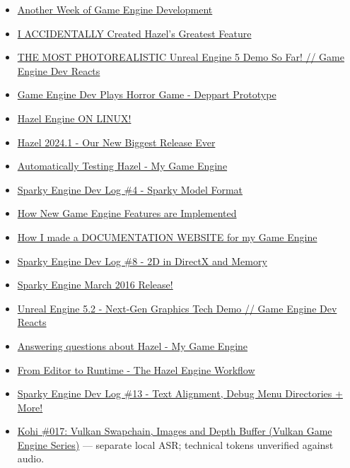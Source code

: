 \begin{itemize}
\item
  \href{https://www.youtube.com/watch?v=Dr6ly-PO9nM}{Another Week of Game Engine Development}
\item
  \href{https://www.youtube.com/watch?v=yMRp9DVZYnI}{I ACCIDENTALLY Created Hazel's Greatest Feature}
\item
  \href{https://www.youtube.com/watch?v=jbEfCcl7gOw}{THE MOST PHOTOREALISTIC Unreal Engine 5 Demo So Far! // Game Engine Dev Reacts}
\item
  \href{https://www.youtube.com/watch?v=Y3-p6MlTjLA}{Game Engine Dev Plays Horror Game - Deppart Prototype}
\item
  \href{https://www.youtube.com/watch?v=I4TQI7st0pc}{Hazel Engine ON LINUX!}
\item
  \href{https://www.youtube.com/watch?v=10OVd1VHEZ4}{Hazel 2024.1 - Our New Biggest Release Ever}
\item
  \href{https://www.youtube.com/watch?v=0RDI41oBcmQ}{Automatically Testing Hazel - My Game Engine}
\item
  \href{https://www.youtube.com/watch?v=EUy8G3uMitI}{Sparky Engine Dev Log \#4 - Sparky Model Format}
\item
  \href{https://www.youtube.com/watch?v=z1O6AZWuWm4}{How New Game Engine Features are Implemented}
\item
  \href{https://www.youtube.com/watch?v=tJDof3nrfHU}{How I made a DOCUMENTATION WEBSITE for my Game Engine}
\item
  \href{https://www.youtube.com/watch?v=4PLF6Gfl0yc}{Sparky Engine Dev Log \#8 - 2D in DirectX and Memory}
\item
  \href{https://www.youtube.com/watch?v=o4_tPhgslcU}{Sparky Engine March 2016 Release!}
\item
  \href{https://www.youtube.com/watch?v=dBCadmP2lIs}{Unreal Engine 5.2 - Next-Gen Graphics Tech Demo // Game Engine Dev Reacts}
\item
  \href{https://www.youtube.com/watch?v=h8AmScYcyVA}{Answering questions about Hazel - My Game Engine}
\item
  \href{https://www.youtube.com/watch?v=Z2U-S3fxAg8}{From Editor to Runtime - The Hazel Engine Workflow}
\item
  \href{https://www.youtube.com/watch?v=njTgcayfhJU}{Sparky Engine Dev Log \#13 - Text Alignment, Debug Menu Directories + More!}
\item
  \href{https://www.youtube.com/watch?v=jWKVb_QdSNM}{Kohi \#017: Vulkan Swapchain, Images and Depth Buffer (Vulkan Game Engine Series)} --- separate local ASR; technical tokens unverified against audio.
\end{itemize}

